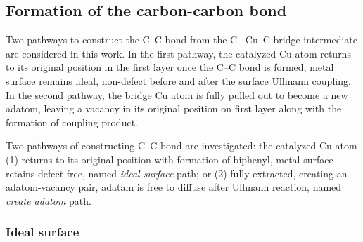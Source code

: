 \documentclass[%
 reprint,
 amsmath,amssymb,
 aps,
prb,
floatfix,
]{revtex4-2}
\newcommand{\lock}{\color{red}}
\newcommand{\lock}{\color{red}}
\newcommand{\comm}{\color{Purple}} %
\begin{document}

\subsection{Formation of the carbon-carbon bond}

{\lock
Two pathways to construct the C--C bond from the C-- Cu--C bridge intermediate are considered in this work. In the first pathway, the catalyzed Cu atom returns to its original position in the first layer once the C--C bond is formed, metal surface remains ideal, non-defect before and after the surface Ullmann coupling. In the second pathway, the bridge Cu atom is fully pulled out to become a new adatom, leaving a vacancy in its original position on first layer along with the formation of coupling product.
}

{\color{blue}
Two pathways of constructing C--C bond are investigated: the catalyzed Cu atom (1) returns to its original position with formation of biphenyl, metal surface retains defect-free, named \textit{ideal surface} path; or (2) fully extracted, creating an adatom-vacancy pair, adatam is free to diffuse after Ullmann reaction, named \textit{create adatom} path. 
}

\subsubsection{Ideal surface}


\end{document}

